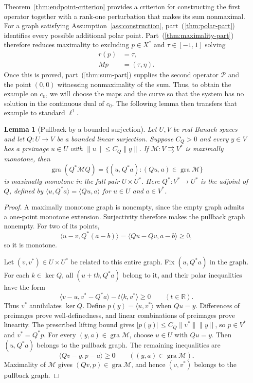 \documentclass[11pt]{article}
\newcommand{\R}{\mathbb R}
\newcommand{\gra}{\operatorname{gra}}
\newcommand{\pair}[2]{\langle #1,#2\rangle}
\newtheorem{lemma}{Lemma}
\theoremstyle{definition}
\theoremstyle{remark}
\begin{document}
Theorem~\ref{thm:endpoint-criterion} provides a criterion for constructing the first operator together with a rank-one perturbation that makes its sum nonmaximal. For a graph satisfying Assumption~\ref{ass:construction}, part~\textup{(\ref{thm:polar-part})} identifies every possible additional polar point. Part~\textup{(\ref{thm:maximality-part})} therefore reduces maximality to excluding $p\in X^*$ and $\tau\in[-1,1]$ solving
\[
\begin{aligned}
r(p)&=\tau,\\
Mp&=(\tau,\eta).
\end{aligned}
\]
Once this is proved, part~\textup{(\ref{thm:sum-part})} supplies the second operator $\mathcal P$ and the point $(0,0)$ witnessing nonmaximality of the sum. Thus, to obtain the example on $c_0$, we will choose the maps and the curve so that the system has no solution in the continuous dual of $c_0$. The following lemma then transfers that example to standard $\ell^1$.

\begin{lemma}[Pullback by a bounded surjection]
\label{lem:surjection-transport}
Let $U,V$ be real Banach spaces and let $Q:U\to V$ be a bounded linear surjection. Suppose $C_Q>0$ and every $y\in V$ has a preimage $u\in U$ with $\|u\|\le C_Q\|y\|$. If $\mathcal M:V\rightrightarrows V^*$ is maximally monotone, then
\[
\gra(Q^*\mathcal M Q)
=\{(u,Q^*a):(Qu,a)\in\gra\mathcal M\}
\]
is maximally monotone in the full pair $U\times U^*$. Here $Q^*:V^*\to U^*$ is the adjoint of $Q$, defined by $\pair{u}{Q^*a}=\pair{Qu}{a}$ for $u\in U$ and $a\in V^*$.
\end{lemma}
\begin{proof}
A maximally monotone graph is nonempty, since the empty graph admits a one-point monotone extension. Surjectivity therefore makes the pullback graph nonempty. For two of its points,
\[
\pair{u-v}{Q^*(a-b)}=\pair{Qu-Qv}{a-b}\ge0,
\]
so it is monotone.

Let $(v,v^*)\in U\times U^*$ be related to this entire graph. Fix $(u,Q^*a)$ in the graph. For each $k\in\ker Q$, all $(u+t k,Q^*a)$ belong to it, and their polar inequalities have the form
\[
\pair{v-u}{v^*-Q^*a}-t\pair{k}{v^*}\ge0
\qquad(t\in\R).
\]
Thus $v^*$ annihilates $\ker Q$. Define $p(y)=\pair{u}{v^*}$ when $Qu=y$. Differences of preimages prove well-definedness, and linear combinations of preimages prove linearity. The prescribed lifting bound gives $|p(y)|\le C_Q\|v^*\|\|y\|$, so $p\in V^*$ and $v^*=Q^*p$. For every $(y,a)\in\gra\mathcal M$, choose $u\in U$ with $Qu=y$. Then $(u,Q^*a)$ belongs to the pullback graph. The remaining inequalities are
\[
\pair{Qv-y}{p-a}\ge0\qquad((y,a)\in\gra\mathcal M).
\]
Maximality of $\mathcal M$ gives $(Qv,p)\in\gra\mathcal M$, and hence $(v,v^*)$ belongs to the pullback graph.
\end{proof}
\end{document}
